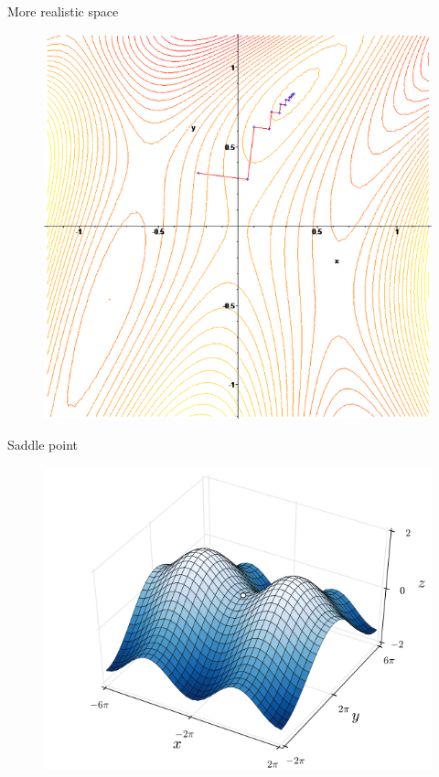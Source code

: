 \documentclass{beamer}
\begin{document}
\begin{frame}{More realistic space}

\begin{figure}[h]
\includegraphics[scale=0.35]{img/real_space}
\end{figure}

\end{frame}
\begin{frame}{Saddle point}

\begin{figure}[h]
\includegraphics[scale=0.55]{img/saddle}
\end{figure}

\end{frame}
\end{document}
